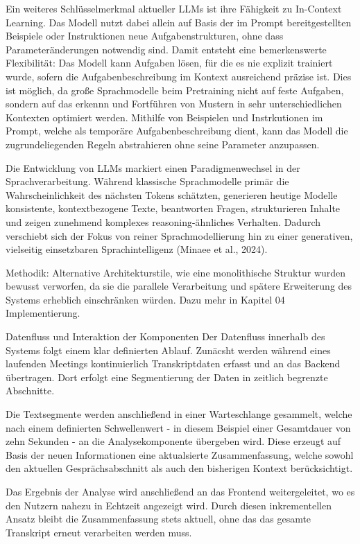 Ein weiteres Schlüsselmerkmal aktueller LLMs ist ihre Fähigkeit zu In-Context Learning. Das Modell nutzt dabei allein auf Basis der im Prompt bereitgestellten Beispiele oder Instruktionen neue Aufgabenstrukturen, ohne dass Parameteränderungen notwendig sind. Damit entsteht eine bemerkenswerte Flexibilität: Das Modell kann Aufgaben lösen, für die es nie explizit trainiert wurde, sofern die Aufgabenbeschreibung im Kontext ausreichend präzise ist. Dies ist möglich, da große Sprachmodelle beim Pretraining nicht auf feste Aufgaben, sondern auf das erkennn und Fortführen von Mustern in sehr unterschiedlichen Kontexten optimiert werden. Mithilfe von Beispielen und Instrkutionen im Prompt, welche als temporäre Aufgabenbeschreibung dient, kann das Modell die zugrundeliegenden Regeln abstrahieren ohne seine Parameter anzupassen. 

Die Entwicklung von LLMs markiert einen Paradigmenwechsel in der Sprachverarbeitung. Während klassische Sprachmodelle primär die Wahrscheinlichkeit des nächsten Tokens schätzten, generieren heutige Modelle konsistente, kontextbezogene Texte, beantworten Fragen, strukturieren Inhalte und zeigen zunehmend komplexes reasoning-ähnliches Verhalten. Dadurch verschiebt sich der Fokus von reiner Sprachmodellierung hin zu einer generativen, vielseitig einsetzbaren Sprachintelligenz (Minaee et al., 2024).

Methodik:
Alternative Architekturstile, wie eine monolithische Struktur wurden bewusst verworfen, da sie die parallele Verarbeitung und spätere Erweiterung des Systems erheblich einschränken würden. Dazu mehr in Kapitel 04 Implementierung. 

Datenfluss und Interaktion der Komponenten
Der Datenfluss innerhalb des Systems folgt einem klar definierten Ablauf. Zunäcsht werden während eines laufenden Meetings kontinuierlich Transkriptdaten erfasst und an das Backend übertragen. Dort erfolgt eine Segmentierung der Daten in zeitlich begrenzte Abschnitte. 

Die Textsegmente werden anschließend in einer Warteschlange gesammelt, welche nach einem definierten Schwellenwert - in diesem Beispiel einer Gesamtdauer von zehn Sekunden - an die Analysekomponente übergeben wird. Diese erzeugt auf Basis der neuen Informationen eine aktualsierte Zusammenfassung, welche sowohl den aktuellen Gesprächsabschnitt als auch den bisherigen Kontext berücksichtigt. 

Das Ergebnis der Analyse wird anschließend an das Frontend weitergeleitet, wo es den Nutzern nahezu in Echtzeit angezeigt wird. Durch diesen inkrementellen Ansatz bleibt die Zusammenfassung stets aktuell, ohne das das gesamte Transkript erneut verarbeiten werden muss. 

